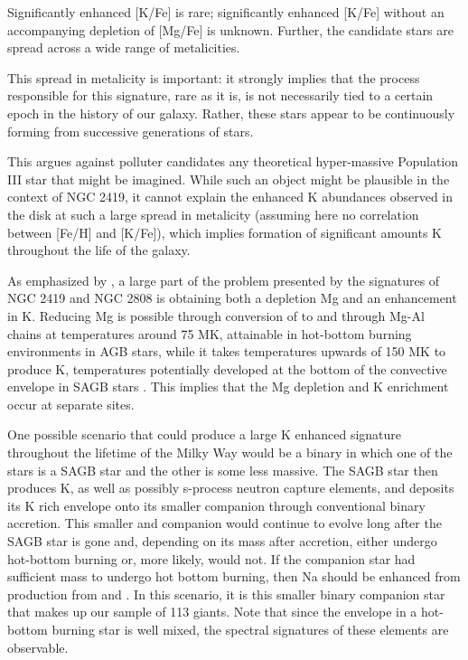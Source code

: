 \documentclass[a4paper,fleqn,usenatbib]{mnras}
\begin{document}
Significantly enhanced [K/Fe] is rare; significantly enhanced [K/Fe] without an accompanying depletion of [Mg/Fe] is unknown. Further, the candidate stars are spread across a wide range of metalicities.

This spread in metalicity is important: it strongly implies that the process responsible for this signature, rare as it is, is not necessarily tied to a certain epoch in the history of our galaxy. Rather, these stars appear to be continuously forming from successive generations of stars. 

This argues against polluter candidates any theoretical hyper-massive Population III star that might be imagined. While such an object might be plausible in the context of NGC 2419, it cannot explain the enhanced K abundances observed in the disk at such a large spread in metalicity (assuming here no correlation between [Fe/H] and [K/Fe]), which implies formation of significant amounts K throughout the life of the galaxy.

As emphasized by \cite{prantzos2017}, a large part of the problem presented by the signatures of NGC 2419 and NGC 2808 is obtaining both a depletion Mg and an enhancement in K. Reducing Mg is possible through conversion of  to  and through Mg-Al chains at temperatures around 75 MK, attainable in hot-bottom burning environments in AGB stars, while it takes temperatures upwards of 150 MK to produce K, temperatures potentially developed at the bottom of the convective envelope in SAGB stars \citep{iliadis2016}. This implies that the Mg depletion and K enrichment occur at separate sites.

One possible scenario that could produce a large K enhanced signature throughout the lifetime of the Milky Way would be a binary in which one of the stars is a SAGB star and the other is some less massive. The SAGB star then produces K, as well as possibly s-process neutron capture elements, and deposits its K rich envelope onto its smaller companion through conventional binary accretion. This smaller and companion would continue to evolve long after the SAGB star is gone and, depending on its mass after accretion, either undergo hot-bottom burning or, more likely, would not. If the companion star had sufficient mass to undergo hot bottom burning, then Na should be enhanced from production from  and . In this scenario, it is this smaller binary companion star that makes up our sample of 113 giants. Note that since the envelope in a hot-bottom burning star is well mixed, the spectral signatures of these elements are observable.
\end{document}
